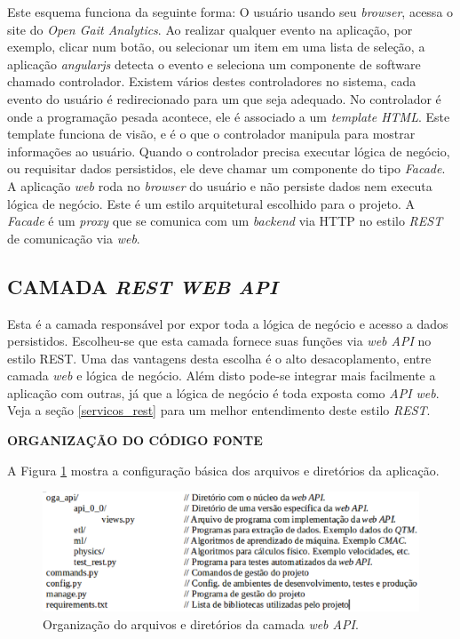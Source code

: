 Este esquema funciona da seguinte forma: O usuário usando seu \emph{browser}, acessa o site do \emph{Open Gait Analytics}. 
Ao realizar qualquer evento na aplicação, por exemplo, clicar num botão, ou selecionar um item em uma lista de seleção, a aplicação \emph{angularjs} detecta o evento e seleciona um componente de software chamado controlador. 
Existem vários destes controladores no sistema, cada evento do usuário é redirecionado para um que seja adequado.
No controlador é onde a programação pesada acontece, ele é associado a um \emph{template HTML}. 
Este template funciona de visão, e é o que o controlador manipula para mostrar informações ao usuário.
Quando o controlador precisa executar lógica de negócio, ou requisitar dados persistidos, ele deve chamar um componente do tipo \emph{Facade}. 
A aplicação \emph{web} roda no \emph{browser} do usuário e não persiste dados nem executa lógica de negócio. 
Este é um estilo arquitetural escolhido para o projeto.
A \emph{Facade} é um \emph{proxy} que se comunica com um \emph{backend} via HTTP no estilo \emph{REST} de comunicação via \emph{web}.


\subsection{CAMADA \emph{REST WEB API}}

Esta é a camada responsável por expor toda a lógica de negócio e acesso a dados persistidos. Escolheu-se que esta camada fornece suas funções via \emph{web API} no estilo REST.
Uma das vantagens desta escolha é o alto desacoplamento, entre camada \emph{web} e lógica de negócio. 
Além disto pode-se integrar mais facilmente a aplicação com outras, já que a lógica de negócio é toda exposta como \emph{API web}. 
Veja a seção \ref{servicos_rest} para um melhor entendimento deste estilo \emph{REST}.

\textbf{ORGANIZAÇÃO DO CÓDIGO FONTE}

A Figura \ref{dir_api} mostra a configuração básica dos arquivos e diretórios da aplicação.

\begin{figure}[ht]
	\centering
	\includegraphics[width=15cm]{figuras/dir_api.eps}
	\caption{Organização do arquivos e diretórios da camada \emph{web API}.}
	\label{dir_api}
\end{figure}

